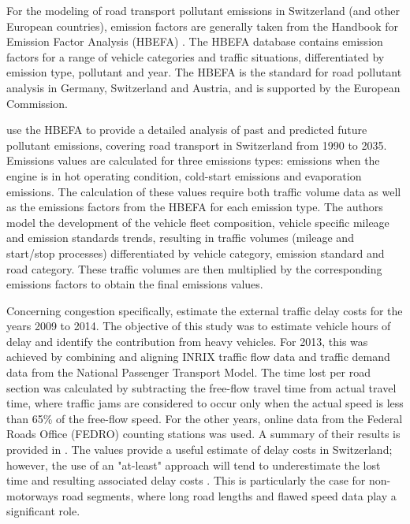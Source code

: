 For the modeling of road transport pollutant emissions in Switzerland (and other European countries), emission factors are generally taken from the Handbook for Emission Factor Analysis (HBEFA) \citep{maibach2008handbook}.
The HBEFA database contains emission factors for a range of vehicle categories and traffic situations, differentiated by emission type, pollutant and year. 
The HBEFA is the standard for road pollutant analysis in Germany, Switzerland and Austria, and is supported by the European Commission. 

\citet{foen2010pollutants} use the HBEFA to provide a detailed analysis of past and predicted future pollutant emissions, covering road transport in Switzerland from 1990 to 2035.
Emissions values are calculated for three emissions types: emissions when the engine is in hot operating condition, cold-start emissions and evaporation emissions.
The calculation of these values require both traffic volume data as well as the emissions factors from the HBEFA for each emission type.
The authors model the development of the vehicle fleet composition, vehicle specific mileage and emission standards trends, resulting in traffic volumes (mileage and start/stop processes) differentiated by vehicle category, emission standard and road category.
These traffic volumes are then multiplied by the corresponding emissions factors to obtain the final emissions values.

Concerning congestion specifically, \citet{mkinfras2016staukosten} estimate the external traffic delay costs for the years 2009 to 2014.
The objective of this study was to estimate vehicle hours of delay and identify the contribution from heavy vehicles.
For 2013, this was achieved by combining and aligning INRIX traffic flow data and traffic demand data from the National Passenger Transport Model.
The time lost per road section was calculated by subtracting the free-flow travel time from actual travel time, where traffic jams are considered to occur only when the actual speed is less than 65\% of the free-flow speed.
For the other years, online data from the Federal Roads Office (FEDRO) counting stations was used.
A summary of their results is provided in .
The values provide a useful estimate of delay costs in Switzerland; however, the use of an "at-least" approach will tend to underestimate the lost time and resulting associated delay costs \citep{mkinfras2016staukosten}.
This is particularly the case for non-motorways road segments, where long road lengths and flawed speed data play a significant role.

